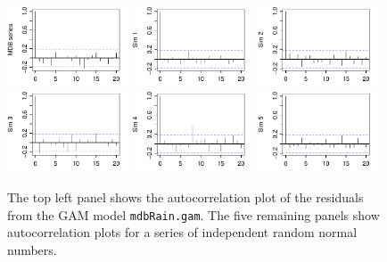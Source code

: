\documentclass[12pt, a4paper,  BCOR=8.25mm, DIV=15]{scrartcl}\usepackage[]{graphicx}\usepackage[]{color}
\newenvironment{knitrout}{}{} %
\newcommand{\txtt}[1]{{\texttt{#1}}}
\begin{document}
\begin{figure}
\begin{knitrout}
\color{fgcolor}

{\centering \includegraphics[width=0.32\textwidth]{figs/xmeth-ar1sims-12_10-1} 
\includegraphics[width=0.32\textwidth]{figs/xmeth-ar1sims-12_10-2} 
\includegraphics[width=0.32\textwidth]{figs/xmeth-ar1sims-12_10-3} 
\includegraphics[width=0.32\textwidth]{figs/xmeth-ar1sims-12_10-4} 
\includegraphics[width=0.32\textwidth]{figs/xmeth-ar1sims-12_10-5} 
\includegraphics[width=0.32\textwidth]{figs/xmeth-ar1sims-12_10-6} 

}



\end{knitrout}
\caption{The top left panel shows the autocorrelation plot of the
  residuals from the GAM model \txtt{mdbRain.gam}.  The five remaining
  panels show autocorrelation plots for a series of independent random
  normal numbers.}\label{fig:ar1sims}
\end{figure}
\end{document}
